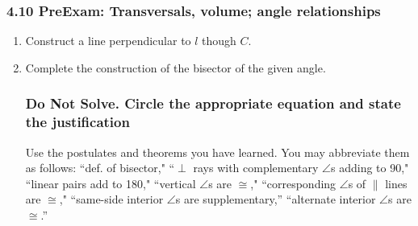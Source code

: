 \documentclass[12pt, twoside]{article}
\begin{document}
\subsubsection*{4.10 PreExam: Transversals, volume; angle relationships}
  \vspace{0.25cm}
  \begin{enumerate}

  \item Construct a line perpendicular to $l$ though $C$.\\
    \vspace{2cm}
    \begin{center}
  \end{center} \vspace{2cm}

  \item Complete the construction of the bisector of the given angle. 
  \vspace{2cm}
    \begin{center}
    \end{center} \vspace{3cm}  

\newpage

\subsubsection*{Do Not Solve. Circle the appropriate equation and state the justification}
Use the postulates and theorems you have learned. You may abbreviate them as follows: ``def. of bisector," ``$\perp$ rays  with complementary $\angle$s adding to 90," ``linear pairs add to 180," ``vertical $\angle$s are $\cong$," ``corresponding $\angle$s of $\parallel$ lines are $\cong$," ``same-side interior $\angle$s are supplementary,'' ``alternate interior $\angle$s are $\cong$.''


\end{enumerate}
\end{document}
